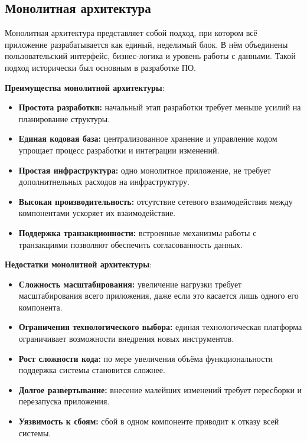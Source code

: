 \subsection{Монолитная архитектура}

Монолитная архитектура представляет собой подход, при котором всё приложение разрабатывается как единый, неделимый блок. В нём объединены пользовательский интерфейс, бизнес-логика и уровень работы с данными. Такой подход исторически был основным в разработке ПО.

\textbf{Преимущества монолитной архитектуры}:
\begin{itemize}
    \item \textbf{Простота разработки:} начальный этап разработки требует меньше усилий на планирование структуры.
    \item \textbf{Единая кодовая база:} централизованное хранение и управление кодом упрощает процесс разработки и интеграции изменений.
    \item \textbf{Простая инфраструктура:} одно монолитное приложение, не требует дополнитнельных расходов на инфраструктуру.
    \item \textbf{Высокая производительность:} отсутствие сетевого взаимодействия между компонентами ускоряет их взаимодействие.
    \item \textbf{Поддержка транзакционности:} встроенные механизмы работы с транзакциями позволяют обеспечить согласованность данных.
\end{itemize}

\textbf{Недостатки монолитной архитектуры}:
\begin{itemize}
    \item \textbf{Сложность масштабирования:} увеличение нагрузки требует масштабирования всего приложения, даже если это касается лишь одного его компонента.
    \item \textbf{Ограничения технологического выбора:} единая технологическая платформа ограничивает возможности внедрения новых инструментов.
    \item \textbf{Рост сложности кода:} по мере увеличения объёма функциональности поддержка системы становится сложнее.
    \item \textbf{Долгое развертывание:} внесение малейших изменений требует пересборки и перезапуска приложения.
    \item \textbf{Уязвимость к сбоям:} сбой в одном компоненте приводит к отказу всей системы.
\end{itemize}


